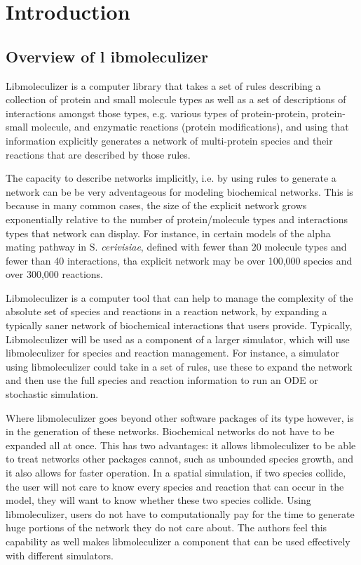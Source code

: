 \chapter{Introduction}

\section{Overview of l ibmoleculizer}
Libmoleculizer is a computer library that takes a set of rules
describing a collection of protein and small molecule types as well as
a set of descriptions of interactions amongst those types,
e.g. various types of protein-protein, protein-small molecule, and
enzymatic reactions (protein modifications), and using that
information explicitly generates a network of multi-protein species
and their reactions that are described by those rules.

The capacity to describe networks implicitly, i.e. by using rules to
generate a network can be be very adventageous for modeling
biochemical networks.  This is because in many common cases, the size
of the explicit network grows exponentially relative to the number of
protein/molecule types and interactions types that network can
display.  For instance, in certain models of the alpha mating pathway
in S. {\it cerivisiae}, defined with fewer than 20 molecule types and
fewer than 40 interactions, tha explicit network may be over 100,000
species and over 300,000 reactions.  

Libmoleculizer is a computer tool that can help to manage the
complexity of the absolute set of species and reactions in a reaction
network, by expanding a typically saner network of biochemical
interactions that users provide.  Typically, Libmoleculizer will be
used as a component of a larger simulator, which will use
libmoleculizer for species and reaction management.  For instance, a
simulator using libmoleculizer could take in a set of rules, use these
to expand the network and then use the full species and reaction
information to run an ODE or stochastic simulation.  

Where libmoleculizer goes beyond other software packages of its type
however, is in the generation of these networks.  Biochemical networks
do not have to be expanded all at once.  This has two advantages: it
allows libmoleculizer to be able to treat networks other packages
cannot, such as unbounded species growth, and it also allows for
faster operation.  In a spatial simulation, if two species collide,
the user will not care to know every species and reaction that can
occur in the model, they will want to know whether these two species
collide.  Using libmoleculizer, users do not have to computationally
pay for the time to generate huge portions of the network they do not
care about.  The authors feel this capability as well makes
libmoleculizer a component that can be used effectively with different
simulators.

